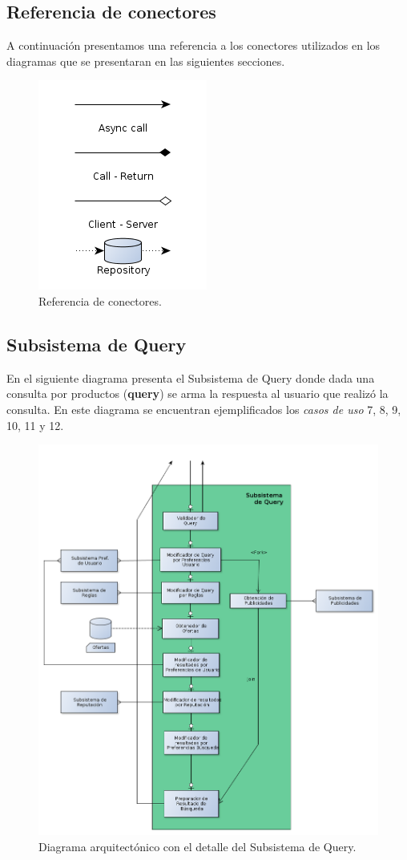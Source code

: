 \subsection{Referencia de conectores}
A continuación presentamos una referencia a los conectores utilizados en los diagramas que se presentaran en las siguientes secciones.

\begin{figure}[H]
	\centering
	\includegraphics[scale=0.6]{graficos/call_reference.png}
	\caption{Referencia de conectores.}
\end{figure}

\subsection{Subsistema de Query}

En el siguiente diagrama presenta el \textsf{Subsistema de Query} donde dada una consulta por productos (\textbf{query}) se arma la respuesta al usuario que realizó la consulta. En este diagrama se encuentran ejemplificados los \emph{casos de uso} 7, 8, 9, 10, 11 y 12.

\begin{figure}[H]
	\centering
	\includegraphics[]{graficos/arch/subsistema_query.png}
	\caption{Diagrama arquitectónico con el detalle del \textsf{Subsistema de Query}.}
\end{figure}
